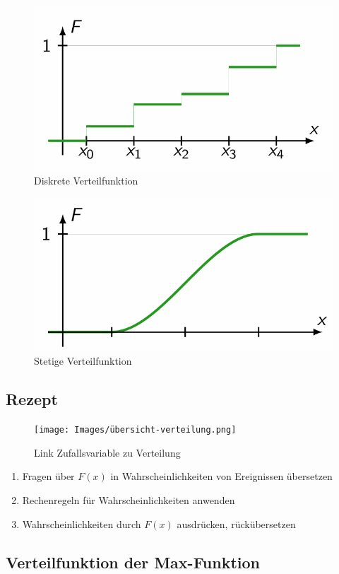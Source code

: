 \documentclass[../Main.tex]{subfiles}
\begin{document}
\begin{figure}[H]
    \centering
    \includegraphics[width=0.5\linewidth]{Images/stetigef.png}
    \caption{Diskrete Verteilfunktion}
\end{figure}
\begin{figure}[H]
    \centering
    \includegraphics[width=0.5\linewidth]{Images/stetf.png}
    \caption{Stetige Verteilfunktion}
\end{figure}

\subsection{Rezept}
\begin{figure}[H]
    \centering
    \texttt{[image: Images/übersicht-verteilung.png]}
    \caption{Link Zufallsvariable zu Verteilung}
\end{figure}
\begin{enumerate}
    \item Fragen über \(F(x)\) in Wahrscheinlichkeiten von Ereignissen übersetzen
    \item Rechenregeln für Wahrscheinlichkeiten anwenden
    \item Wahrscheinlichkeiten durch \(F(x)\) ausdrücken, rückübersetzen
\end{enumerate}

\subsection{Verteilfunktion der Max-Funktion}
\end{document}
